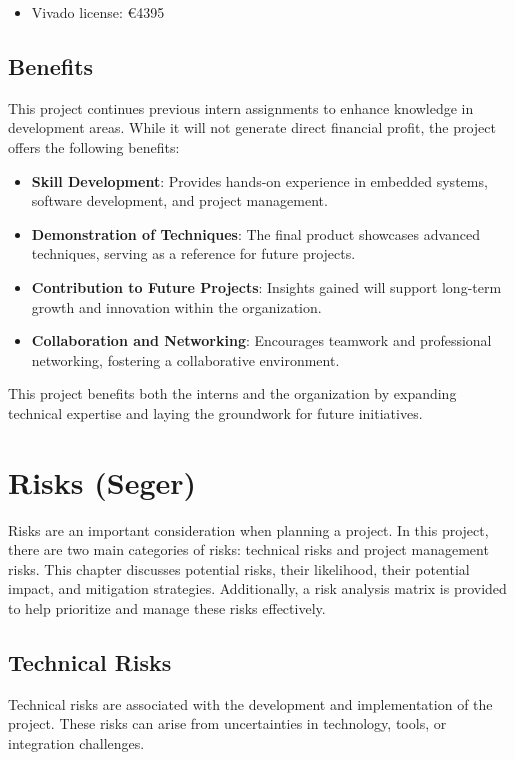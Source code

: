 \documentclass{article}
\begin{document}
\begin{itemize}
    \item Vivado license: \euro 4395
\end{itemize}
\subsection{Benefits}

This project continues previous intern assignments to enhance knowledge in
development areas. While it will not generate direct financial profit, the
project offers the following benefits:

\begin{itemize} 
    \item \textbf{Skill Development}: Provides hands-on experience
    in embedded systems, software development, and project management. 
    \item \textbf{Demonstration of Techniques}: The final product showcases advanced
    techniques, serving as a reference for future projects. 
    \item \textbf{Contribution to Future Projects}: Insights gained will support long-term
    growth and innovation within the organization. 
    \item \textbf{Collaboration and Networking}: Encourages teamwork and professional networking, fostering a
    collaborative environment. 
\end{itemize}

This project benefits both the interns and the organization by expanding
technical expertise and laying the groundwork for future initiatives.
\newpage

\section{Risks (Seger)}
Risks are an important consideration when planning a project. In this project, there are two main categories of risks: technical risks and project management risks. This chapter discusses potential risks, their likelihood, their potential impact, and mitigation strategies. Additionally, a risk analysis matrix is provided to help prioritize and manage these risks effectively.

\subsection{Technical Risks}
Technical risks are associated with the development and implementation of the project. These risks can arise from uncertainties in technology, tools, or integration challenges.
\end{document}
